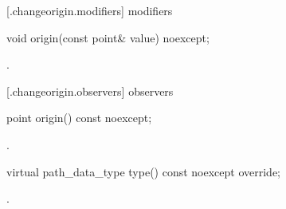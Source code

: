  [\iotwod.changeorigin.modifiers]{ modifiers}

\begin{itemdecl}
    void origin(const point& value) noexcept;
\end{itemdecl}
\begin{itemdescr}
	\pnum
	\postconditions
	.
	
\end{itemdescr}

 [\iotwod.changeorigin.observers]{ observers}

\begin{itemdecl}
    point origin() const noexcept;
\end{itemdecl}
\begin{itemdescr}
	\pnum
	\returns
	.

\end{itemdescr}

\begin{itemdecl}
    virtual path_data_type type() const noexcept override;
\end{itemdecl}
\begin{itemdescr}
	\pnum
	\returns
	.

\end{itemdescr}
